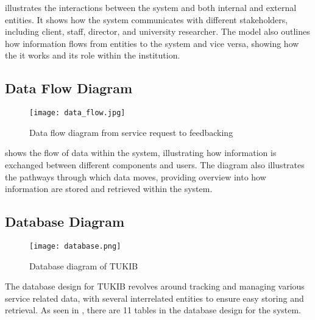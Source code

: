  illustrates the interactions between the system and both internal and external entities. It shows how the system communicates with different stakeholders, including client, staff, director, and university researcher. The model also outlines how information flows from entities to the system and vice versa, showing how the it works and its role within the institution.

\newpage

\subsection{Data Flow Diagram}

\begin{figure}[h]
	\centering 
	\texttt{[image: data\_flow.jpg]}
	\caption{Data flow diagram from service request to feedbacking}
	\label{fig:data_flow}
\end{figure}

 shows the flow of data within the system, illustrating how information is exchanged between different components and users. The diagram also illustrates the pathways through which data moves, providing overview into how information are stored and retrieved within the system.

\newpage

\subsection{Database Diagram}

\begin{figure}[h]
	\centering 
	\texttt{[image: database.png]}
	\caption{Database diagram of TUKIB}
	\label{fig:database}
\end{figure}

The database design for TUKIB revolves around tracking and managing various service related data, with several interrelated entities to ensure easy storing and retrieval. As seen in , there are 11 tables in the database design for the system. 


